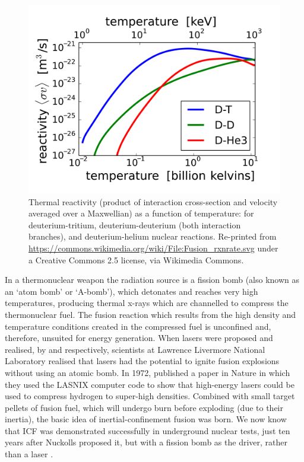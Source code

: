 \begin{figure}
 \centering
 \includegraphics[width=0.7\columnwidth]{Chapters/C1_Introduction/crossSection.png}
 \caption{Thermal reactivity (product of interaction cross-section and velocity averaged over a Maxwellian) as a function of temperature: for deuterium-tritium, deuterium-deuterium (both interaction branches), and deuterium-helium nuclear reactions. Re-printed from \url{https://commons.wikimedia.org/wiki/File:Fusion_rxnrate.svg} under a Creative Commons 2.5 license, via Wikimedia Commons.} \label{fig:crossSection}
\end{figure}

In a thermonuclear weapon the radiation source is a fission bomb (also known as an `atom bomb' or `A-bomb'), which detonates and reaches very high temperatures, producing thermal x-rays which are channelled to compress the thermonuclear fuel. The fusion reaction which results from the high density and temperature conditions created in the compressed fuel is unconfined and, therefore, unsuited for energy generation. When lasers were proposed and realised, by \citet{Maser1958} and \citet{Maiman1960} respectively, scientists at Lawrence Livermore National Laboratory realised that lasers had the potential to ignite fusion explosions without using an atomic bomb. In 1972, \citet{Nuckolls1972} published a paper in Nature in which they used the LASNIX computer code to show that high-energy lasers could be used to compress hydrogen to super-high densities. Combined with small target pellets of fusion fuel, which will undergo burn before exploding (due to their inertia), the basic idea of inertial-confinement fusion was born. We now know that ICF was demonstrated successfully in underground nuclear tests, just ten years after Nuckolls proposed it, but with a fission bomb as the driver, rather than a laser \citep{Evans2010}.





